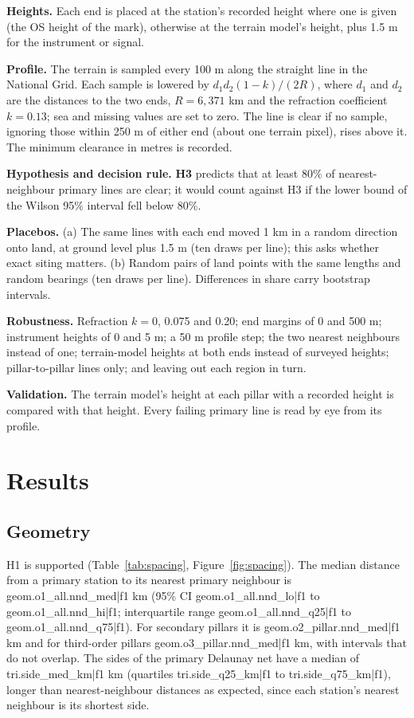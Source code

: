 \documentclass[11pt,a4paper]{article}
\begin{document}
\textbf{Heights.} Each end is placed at the station's recorded height where one is given (the OS height of the mark), otherwise at the terrain model's height, plus 1.5 m for the instrument or signal.

\textbf{Profile.} The terrain is sampled every 100 m along the straight line in the National Grid. Each sample is lowered by $d_1 d_2 (1-k)/(2R)$, where $d_1$ and $d_2$ are the distances to the two ends, $R = 6{,}371$ km and the refraction coefficient $k = 0.13$; sea and missing values are set to zero. The line is clear if no sample, ignoring those within 250 m of either end (about one terrain pixel), rises above it. The minimum clearance in metres is recorded.

\textbf{Hypothesis and decision rule.} \textbf{H3} predicts that at least 80\% of nearest-neighbour primary lines are clear; it would count against H3 if the lower bound of the Wilson 95\% interval fell below 80\%.

\textbf{Placebos.} (a) The same lines with each end moved 1 km in a random direction onto land, at ground level plus 1.5 m (ten draws per line); this asks whether exact siting matters. (b) Random pairs of land points with the same lengths and random bearings (ten draws per line). Differences in share carry bootstrap intervals.

\textbf{Robustness.} Refraction $k = 0$, 0.075 and 0.20; end margins of 0 and 500 m; instrument heights of 0 and 5 m; a 50 m profile step; the two nearest neighbours instead of one; terrain-model heights at both ends instead of surveyed heights; pillar-to-pillar lines only; and leaving out each region in turn.

\textbf{Validation.} The terrain model's height at each pillar with a recorded height is compared with that height. Every failing primary line is read by eye from its profile.

\section{Results}\label{sec:results}
\subsection{Geometry}
H1 is supported (Table~\ref{tab:spacing}, Figure~\ref{fig:spacing}). The median distance from a primary station to its nearest primary neighbour is {{geom.o1_all.nnd_med|f1}} km (95\% CI {{geom.o1_all.nnd_lo|f1}} to {{geom.o1_all.nnd_hi|f1}}; interquartile range {{geom.o1_all.nnd_q25|f1}} to {{geom.o1_all.nnd_q75|f1}}). For secondary pillars it is {{geom.o2_pillar.nnd_med|f1}} km and for third-order pillars {{geom.o3_pillar.nnd_med|f1}} km, with intervals that do not overlap. The sides of the primary Delaunay net have a median of {{tri.side_med_km|f1}} km (quartiles {{tri.side_q25_km|f1}} to {{tri.side_q75_km|f1}}), longer than nearest-neighbour distances as expected, since each station's nearest neighbour is its shortest side.
\end{document}
